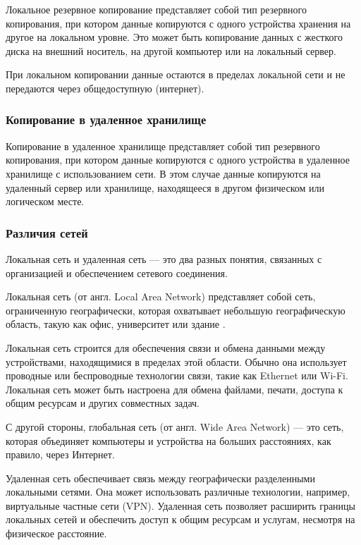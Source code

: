 Локальное резервное копирование представляет собой тип резервного копирования, при котором данные копируются с одного устройства хранения на другое на локальном уровне. Это может быть копирование данных с жесткого диска на внешний носитель, на другой компьютер или на локальный сервер.

При локальном копировании данные остаются в пределах локальной сети и не передаются через общедоступную (интернет).

\subsubsection{Копирование в удаленное хранилище}

Копирование в удаленное хранилище представляет собой тип резервного копирования, при котором данные копируются с одного устройства в удаленное хранилище с использованием сети. В этом случае данные копируются на удаленный сервер или хранилище, находящееся в другом физическом или логическом месте.

\subsubsection{Различия сетей}

Локальная сеть и удаленная сеть --- это два разных понятия, связанных с организацией и обеспечением сетевого соединения.

Локальная сеть (от англ. Local Area Network) представляет собой сеть, ограниченную географически, которая охватывает небольшую географическую область, такую как офис, университет или здание \cite{lan-cloudflare}.

Локальная сеть строится для обеспечения связи и обмена данными между устройствами, находящимися в пределах этой области. Обычно она использует проводные или беспроводные технологии связи, такие как Ethernet или Wi-Fi. Локальная сеть может быть настроена для обмена файлами, печати, доступа к общим ресурсам и других совместных задач.

С другой стороны, глобальная сеть (от англ. Wide Area Network) --- это сеть, которая объединяет компьютеры и устройства на больших расстояниях, как правило, через Интернет. 

Удаленная сеть обеспечивает связь между географически разделенными локальными сетями. Она может использовать различные технологии, например, виртуальные частные сети (VPN). Удаленная сеть позволяет расширить границы локальных сетей и обеспечить доступ к общим ресурсам и услугам, несмотря на физическое расстояние.

